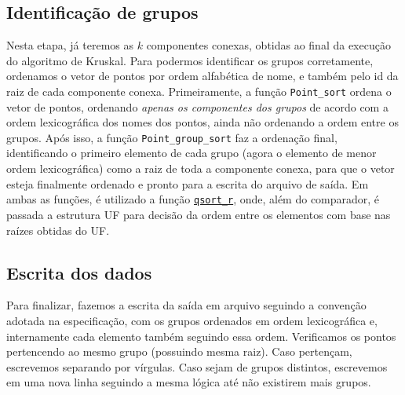 \subsection{Identificação de grupos}
Nesta etapa, já teremos as $k$ componentes conexas, obtidas ao final da execução do algoritmo de Kruskal. Para podermos identificar os grupos corretamente, ordenamos o vetor de pontos por ordem alfabética de nome, e também pelo id da raiz de cada componente conexa. Primeiramente, a função \texttt{Point\_sort} ordena o vetor de pontos, ordenando \emph{apenas os componentes dos grupos} de acordo com a ordem lexicográfica dos nomes dos pontos, ainda não ordenando a ordem entre os grupos. Após isso, a função \texttt{Point\_group\_sort} faz a ordenação final, identificando o primeiro elemento de cada grupo (agora o elemento de menor ordem lexicográfica) como a raiz de toda a componente conexa, para que o vetor esteja finalmente ordenado e pronto para a escrita do arquivo de saída. Em ambas as funções, é utilizado a função \texttt{\href{https://linux.die.net/man/3/qsort_r}{qsort\_r}}, onde, além do comparador, é passada a estrutura UF para decisão da ordem entre os elementos com base nas raízes obtidas do UF.


\subsection{Escrita dos dados}
Para finalizar, fazemos a escrita da saída em arquivo seguindo a convenção adotada na especificação, com os grupos ordenados em ordem lexicográfica e, internamente cada elemento também seguindo essa ordem. Verificamos os pontos pertencendo ao mesmo grupo (possuindo mesma raiz). Caso pertençam, escrevemos separando por vírgulas. Caso sejam de grupos distintos, escrevemos em uma nova linha seguindo a mesma lógica até não existirem mais grupos.
